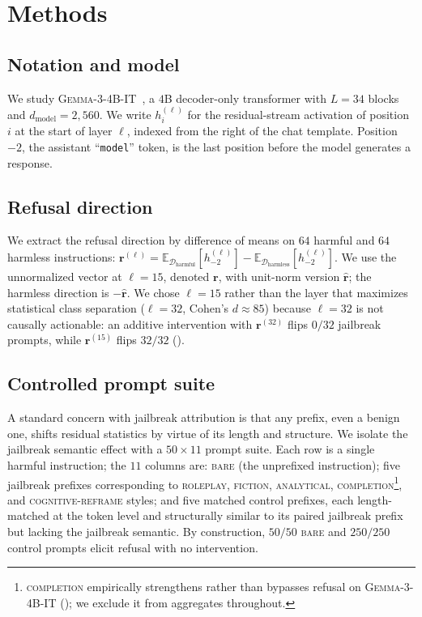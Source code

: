 \documentclass{article}
\newcommand{\rhat}{\hat{\bm{r}}}
\newcommand{\rvec}{\bm{r}}
\newcommand{\Dharm}{\mathcal{D}_{\mathrm{harmful}}}
\newcommand{\Dharmless}{\mathcal{D}_{\mathrm{harmless}}}
\newcommand{\gemma}{\textsc{Gemma-3-4B-IT}}
\begin{document}
\section{Methods}
\label{sec:methods}

\subsection{Notation and model}
We study \gemma~\citep{gemmateam2024gemma}, a $4$B decoder-only
transformer with $L = 34$ blocks and $d_{\mathrm{model}} = 2{,}560$.
We write $h_i^{(\ell)}$ for the residual-stream activation of
position $i$ at the start of layer $\ell$, indexed from the right of
the chat template. Position $-2$, the assistant ``\texttt{model}''
token, is the last position before the model generates a response.

\subsection{Refusal direction}
\label{sec:methods-direction}
We extract the refusal direction by difference of means
\citep{arditi2024refusal} on $64$ harmful and $64$ harmless
instructions: $\rvec^{(\ell)} = \mathbb{E}_{\Dharm}[h_{-2}^{(\ell)}]
- \mathbb{E}_{\Dharmless}[h_{-2}^{(\ell)}]$. We use the unnormalized
vector at $\ell = 15$, denoted $\rvec$, with unit-norm version
$\rhat$; the harmless direction is $-\rhat$. We chose $\ell = 15$
rather than the layer that maximizes statistical class separation
($\ell = 32$, Cohen's $d \approx 85$) because $\ell = 32$ is not
causally actionable: an additive intervention with $\rvec^{(32)}$
flips $0/32$ jailbreak prompts, while $\rvec^{(15)}$ flips $32/32$
().

\subsection{Controlled prompt suite}
\label{sec:methods-dataset}
A standard concern with jailbreak attribution is that any prefix,
even a benign one, shifts residual statistics by virtue of its
length and structure. We isolate the jailbreak semantic effect with
a $50 \times 11$ prompt suite. Each row is a single harmful
instruction; the $11$ columns are: \textsc{bare} (the unprefixed
instruction); five jailbreak prefixes corresponding to
\textsc{roleplay}, \textsc{fiction}, \textsc{analytical},
\textsc{completion}\footnote{\textsc{completion} empirically
strengthens rather than bypasses refusal on \gemma{}
(); we exclude it from aggregates throughout.},
and \textsc{cognitive-reframe} styles; and five matched control
prefixes, each length-matched at the token level and structurally
similar to its paired jailbreak prefix but lacking the jailbreak
semantic. By construction, $50/50$ \textsc{bare} and $250/250$
control prompts elicit refusal with no intervention.
\end{document}
